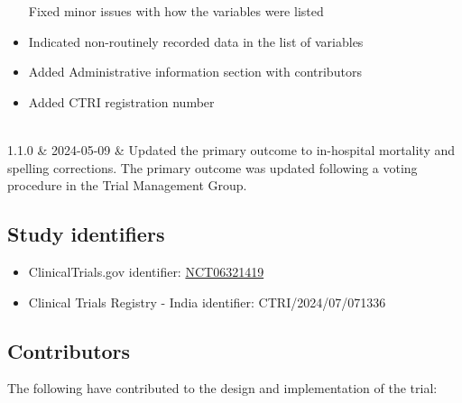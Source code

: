 \documentclass[
]{scrartcl}
\providecommand{\tightlist}{%
  \setlength{\itemsep}{0pt}\setlength{\parskip}{0pt}}\usepackage{longtable,booktabs,array}
\begin{document}
\begin{longtable}[]
\begin{minipage}[t]{\linewidth}
\begin{itemize}
  Fixed minor issues with how the variables were listed
\item
  Indicated non-routinely recorded data in the list of variables
\item
  Added Administrative information section with contributors
\item
  Added CTRI registration number
\end{itemize}
\end{minipage} \\
1.1.0 & 2024-05-09 & Updated the primary outcome to in-hospital
mortality and spelling corrections. The primary outcome was updated
following a voting procedure in the Trial Management Group. \\
\end{longtable}

\hypertarget{study-identifiers}{%
\subsection{Study identifiers}\label{study-identifiers}}

\begin{itemize}
\tightlist
\item
  ClinicalTrials.gov identifier:
  \href{https://clinicaltrials.gov/ct2/show/NCT06321419}{NCT06321419}
\item
  Clinical Trials Registry - India identifier: CTRI/2024/07/071336
\end{itemize}

\hypertarget{contributors}{%
\subsection{Contributors}\label{contributors}}

The following have contributed to the design and implementation of the
trial:
\end{document}
